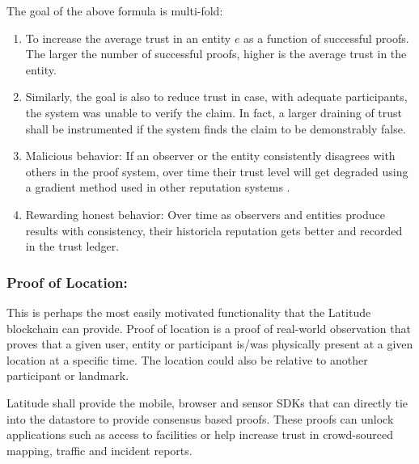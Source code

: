 The goal of the above formula is multi-fold:
\begin{enumerate}
    \item To increase the average trust in an entity $e$ as a function of successful proofs. The larger the number of
        successful proofs, higher is the average trust in the entity.
    \item Similarly, the goal is also to reduce trust in case, with adequate participants, the system was unable to
        verify the claim. In fact, a larger draining of trust shall be instrumented if the system finds the claim to be
        demonstrably false.
    \item Malicious behavior: If an observer or the entity consistently disagrees with others in the proof system,
        over time their trust level will get degraded using a gradient method used in other reputation systems
        \cite{sen2010}.
    \item Rewarding honest behavior: Over time as observers and entities produce results with consistency, their
        historicla reputation gets better and recorded in the trust ledger.
\end{enumerate}

\subsubsection{Proof of Location:}

This is perhaps the most easily motivated functionality that the Latitude blockchain can provide. Proof of location is a
proof of real-world observation that proves that a given user, entity or participant is/was physically present at a given
location at a specific time. The location could also be relative to another participant or landmark.

Latitude shall provide the mobile, browser and sensor SDKs that can directly tie into the datastore to provide consensus
based proofs. These proofs can unlock applications such as access to facilities or help increase trust in crowd-sourced
mapping, traffic and incident reports.

